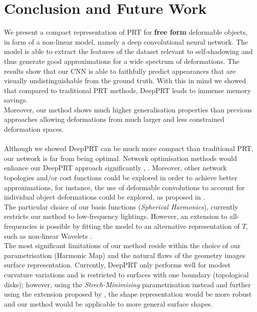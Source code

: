 \section{Conclusion and Future Work}
We present a compact representation of PRT for \textbf{free form} deformable objects, in form of a non-linear model, namely a deep convolutional neural network.  The model is able to extract the features of the dataset relevant to self-shadowing and thus generate good approximations for a wide spectrum of deformations. The results show that our CNN is able to faithfully predict appearances that are visually undistinguishable from the ground truth.  With this in mind we showed that compared to traditional PRT methods, DeepPRT leads to immense memory savings.
\\ 
Moreover, our method shows much higher generalisation properties than previous approaches allowing deformations from much larger and less constrained deformation spaces.\\
\\
Although we showed DeepPRT can be much more compact than traditional PRT, our network is far from being optimal. Network optimisation methods would enhance our DeepPRT approach significantly \cite{Survey_NN_Compression}, \cite{Deep_Compression}.
Moreover, other network topologies and/or cost functions could be explored in order to achieve  better approximations, for instance, the use of deformable convolutions \cite{DeformableCNN} to account for individual object deformations could be explored, as proposed in \cite{Deformable_UNet}.
\\
The particular choice of our basis functions (\textit{Spherical Harmonics}), currently restricts our method to low-frequency lightings. However, an extension to all-frequencies is possible by fitting the model to an alternative representation of $T$, such as non-linear Wavelets \cite{AllFrequencyPRT}.
\\
The most significant limitations of our method reside within the choice of our parametrisation (Harmonic Map) and the natural flaws of the geometry images surface representation.  Currently, DeepPRT only performs well for modest curvature variations and is restricted to surfaces with one boundary (topological disks); however, using the \textit{Strech-Minimising} parametrisation instead and further using the extension proposed by \cite{Spherical_Parametrization}, the shape representation would be more robust and our method would be applicable to more general surface shapes. \\
